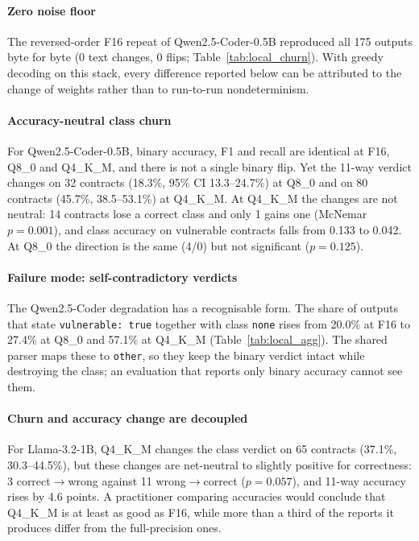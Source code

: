 \paragraph{Zero noise floor}
The reversed-order F16 repeat of Qwen2.5-Coder-0.5B reproduced all 175 outputs byte for byte (0 text changes, 0 flips; Table~\ref{tab:local_churn}). With greedy decoding on this stack, every difference reported below can be attributed to the change of weights rather than to run-to-run nondeterminism.

\paragraph{Accuracy-neutral class churn}
For Qwen2.5-Coder-0.5B, binary accuracy, F1 and recall are identical at F16, Q8\_0 and Q4\_K\_M, and there is not a single binary flip. Yet the 11-way verdict changes on 32 contracts (18.3\%, 95\% CI 13.3--24.7\%) at Q8\_0 and on 80 contracts (45.7\%, 38.5--53.1\%) at Q4\_K\_M. At Q4\_K\_M the changes are not neutral: 14 contracts lose a correct class and only 1 gains one (McNemar $p=0.001$), and class accuracy on vulnerable contracts falls from 0.133 to 0.042. At Q8\_0 the direction is the same (4/0) but not significant ($p=0.125$).

\paragraph{Failure mode: self-contradictory verdicts}
The Qwen2.5-Coder degradation has a recognisable form. The share of outputs that state \texttt{vulnerable: true} together with class \texttt{none} rises from 20.0\% at F16 to 27.4\% at Q8\_0 and 57.1\% at Q4\_K\_M (Table~\ref{tab:local_agg}). The shared parser maps these to \texttt{other}, so they keep the binary verdict intact while destroying the class; an evaluation that reports only binary accuracy cannot see them.

\paragraph{Churn and accuracy change are decoupled}
For Llama-3.2-1B, Q4\_K\_M changes the class verdict on 65 contracts (37.1\%, 30.3--44.5\%), but these changes are net-neutral to slightly positive for correctness: 3 correct$\to$wrong against 11 wrong$\to$correct ($p=0.057$), and 11-way accuracy rises by 4.6 points. A practitioner comparing accuracies would conclude that Q4\_K\_M is at least as good as F16, while more than a third of the reports it produces differ from the full-precision ones.

